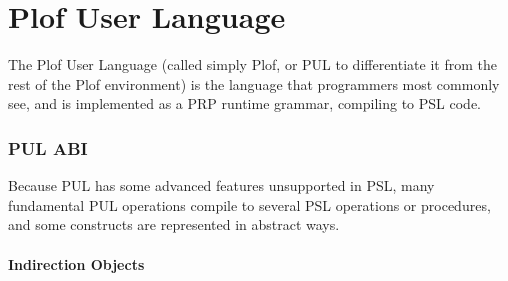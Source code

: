 \begin{comment}
</li><li><p class="P32" style="margin-left:0.635cm;"><span class="Bullet_20_Symbols" style="display:block;float:left;min-width:0.635cm;">•.</span>a regex, surrounded by /'s.<span class="odfLiEnd"/>

</li></ul><p class="P23">The name and associated code are both raw data.

</td></tr><tr><td style="text-align:left;width:0.4444in; " class="Table2_A1"><p class="P21">F1

</td><td style="text-align:left;width:1.0354in; " class="Table2_B1"><p class="P21">grem

</td><td style="text-align:left;width:5.4451in; " class="Table2_B1"><p class="P21">Remove a production from the grammar. Pops the production name and removes it.

</td></tr><tr><td style="text-align:left;width:0.4444in; " class="Table2_A1"><p class="P21">FD

</td><td style="text-align:left;width:1.0354in; " class="Table2_B1"><p class="P21">gcommit

</td><td style="text-align:left;width:5.4451in; " class="Table2_B1"><p class="P21">Commit grammar changes.

</td></tr></table><p class="P1">
\end{comment}



\part{Plof User Language}

The Plof User Language (called simply Plof, or PUL to differentiate it from the rest of the Plof environment) is the language that programmers most commonly see, and is implemented as a PRP runtime grammar, compiling to PSL code.



\section{PUL ABI}

Because PUL has some advanced features unsupported in PSL, many fundamental PUL operations compile to several PSL operations or procedures, and some constructs are represented in abstract ways.



\subsection{Indirection Objects}

